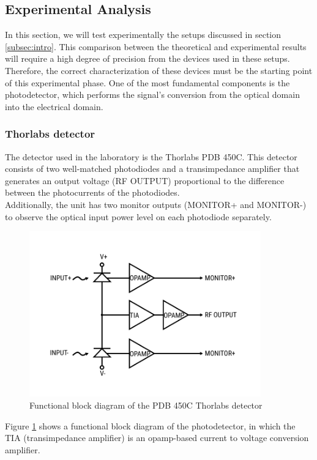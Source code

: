 \subsection{Experimental Analysis}
%
In this section, we will test experimentally the setups discussed in section \ref{subsec:intro}.
%
This comparison between the theoretical and experimental results will require a high degree of precision from the devices used in these setups. Therefore, the correct characterization of these devices must be the starting point of this experimental phase.
One of the most fundamental components is the photodetector, which performs the signal's conversion from the optical domain into the electrical domain.
%
\subsubsection{Thorlabs detector}
%
The detector used in the laboratory is the Thorlabs PDB 450C. This detector consists of two well-matched photodiodes and a transimpedance amplifier that generates an output voltage (RF OUTPUT) proportional to the difference between the photocurrents of the photodiodes.\\
Additionally, the unit has two monitor outputs (MONITOR+ and MONITOR-) to observe the optical input power level on each photodiode separately.
\cite{thorlabs}
%
\begin{figure}[H]
	\centering
	\includegraphics[width=10cm]{./sdf/optical_detection/figures/thorlabs-circuit.pdf}
	\caption{Functional block diagram of the PDB 450C Thorlabs detector \cite{thorlabs}}
	\label{fig:photodetector-circuit}
\end{figure}
%
\noindent
Figure \ref{fig:photodetector-circuit} shows a functional block diagram of the photodetector, in which the TIA (transimpedance amplifier) is an opamp-based current to voltage conversion amplifier.
